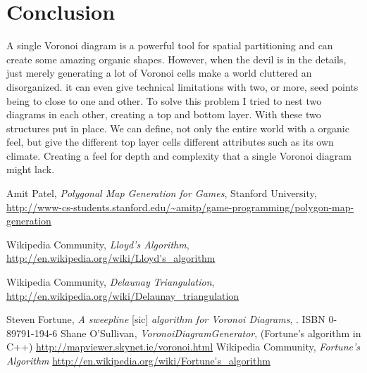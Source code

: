 \documentclass[11pt,a4paper,twocolumn]{article}
\begin{document}
\section{Conclusion}
A single Voronoi diagram is a powerful tool for spatial partitioning and can create some amazing organic shapes. However, when the devil is in the details, just merely generating a lot of Voronoi cells make a world cluttered an disorganized. it can even give technical limitations with two, or more, seed points being to close to one and other. To solve this problem I tried to nest two diagrams in each other, creating a top and bottom layer.
With these two structures put in place. We can define, not only the entire world with a organic feel, but give the different top layer cells different attributes such as its own climate. Creating a feel for depth and complexity that a single Voronoi diagram might lack.
\newpage
\begin{thebibliography}{0}

	Amit Patel,\newline
	\emph{Polygonal Map Generation for Games},\newline
	Stanford University,\newline
	\url{http://www-cs-students.stanford.edu/~amitp/game-programming/polygon-map-generation}

	Wikipedia Community,\newline
	\emph{Lloyd's Algorithm},\newline
	\url{http://en.wikipedia.org/wiki/Lloyd's_algorithm}

	Wikipedia Community,\newline
	\emph{Delaunay Triangulation}, \newline
	\url{http://en.wikipedia.org/wiki/Delaunay_triangulation}

	Steven Fortune,\newline
	\emph{A sweepline} [sic] \emph{algorithm for Voronoi Diagrams}, . ISBN 0-89791-194-6
	Shane O'Sullivan,\newline
	\emph{VoronoiDiagramGenerator},\newline
	(Fortune's algorithm in C++)
	\url{http://mapviewer.skynet.ie/voronoi.html}
	Wikipedia Community,\newline
	\emph{Fortune's Algorithm}
	\url{http://en.wikipedia.org/wiki/Fortune's_algorithm}
\end{thebibliography}
\end{document}
